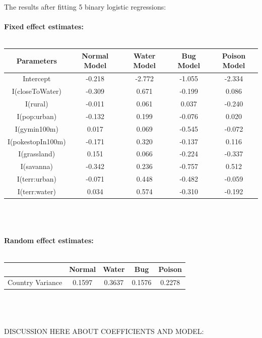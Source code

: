 \documentclass{article}
\begin{document}
\noindent The results after fitting 5 binary logistic regressions: \\ 
\\ 
\textbf{Fixed effect estimates:} \\ \\ 
\begin{tabular}{| c | c | c | c | c |}
	\hline
	Parameters & Normal Model & Water Model & Bug Model & Poison Model \\
	\hline 
	Intercept & -0.218 & -2.772 & -1.055 & -2.334 \\ 
	I(closeToWater) & -0.309 & 0.671 & -0.199 & 0.086 \\ 
	I(rural) & -0.011 & 0.061 & 0.037 & -0.240\\ 
	I(pop:urban) & -0.132 & 0.199 & -0.076 & 0.020 \\ 
	I(gymin100m) & 0.017 & 0.069 & -0.545 &  -0.072 \\ 
	I(pokestopIn100m) & -0.171 & 0.320 & -0.137 & 0.116 \\ 
	I(grassland) & 0.151 & 0.066 & -0.224 & -0.337 \\ 
	I(savanna) & -0.342 & 0.236 & -0.757 & 0.512 \\ 
	I(terr:urban) & -0.071 & 0.448 & -0.482 & -0.059  \\ 
	I(terr:water) & 0.034 & 0.574 & -0.310 & -0.192 \\ 
	\hline
\end{tabular} 
\\ 
\\ 
\\ 
\textbf{Random effect estimates:}\\ \\ 
\begin{tabular}{| c | c | c | c | c |}
	\hline
	& Normal & Water & Bug & Poison \\  
	\hline
	Country Variance & 0.1597 & 0.3637 & 0.1576 & 0.2278 \\ 
	\hline
\end{tabular} 
\\ 
\\ 
\\ 
DISCUSSION HERE ABOUT COEFFICIENTS AND MODEL:
\end{document}
